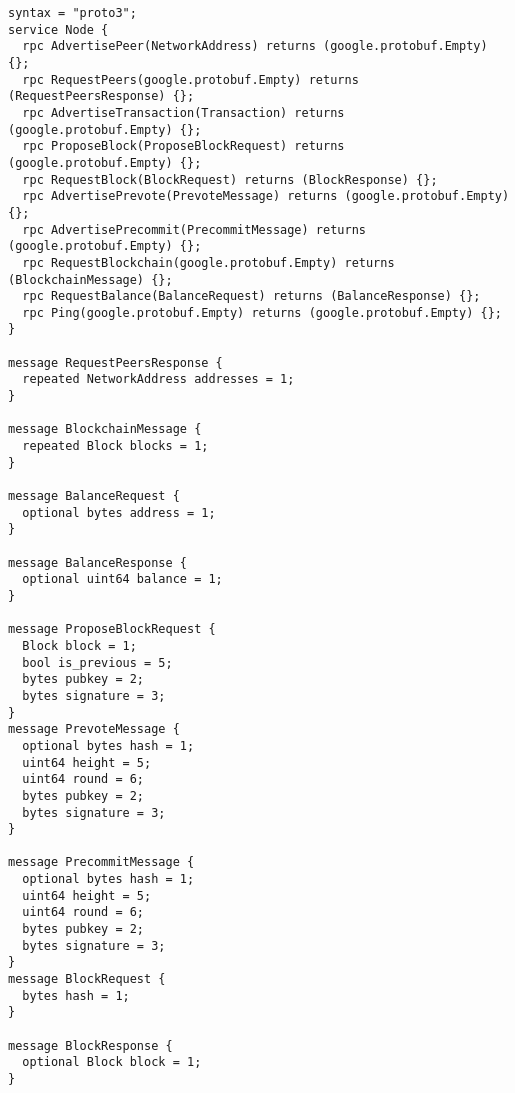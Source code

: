 \begin{verbatim}
syntax = "proto3";
service Node {
  rpc AdvertisePeer(NetworkAddress) returns (google.protobuf.Empty) {};
  rpc RequestPeers(google.protobuf.Empty) returns (RequestPeersResponse) {};
  rpc AdvertiseTransaction(Transaction) returns (google.protobuf.Empty) {};
  rpc ProposeBlock(ProposeBlockRequest) returns (google.protobuf.Empty) {};
  rpc RequestBlock(BlockRequest) returns (BlockResponse) {};
  rpc AdvertisePrevote(PrevoteMessage) returns (google.protobuf.Empty) {};
  rpc AdvertisePrecommit(PrecommitMessage) returns (google.protobuf.Empty) {};
  rpc RequestBlockchain(google.protobuf.Empty) returns (BlockchainMessage) {};
  rpc RequestBalance(BalanceRequest) returns (BalanceResponse) {};
  rpc Ping(google.protobuf.Empty) returns (google.protobuf.Empty) {};
}

message RequestPeersResponse {
  repeated NetworkAddress addresses = 1;
}

message BlockchainMessage {
  repeated Block blocks = 1;
}

message BalanceRequest {
  optional bytes address = 1;
}

message BalanceResponse {
  optional uint64 balance = 1;
}

message ProposeBlockRequest {
  Block block = 1;
  bool is_previous = 5;
  bytes pubkey = 2;
  bytes signature = 3;
}
message PrevoteMessage {
  optional bytes hash = 1;
  uint64 height = 5;
  uint64 round = 6;
  bytes pubkey = 2;
  bytes signature = 3;
}

message PrecommitMessage {
  optional bytes hash = 1;
  uint64 height = 5;
  uint64 round = 6;
  bytes pubkey = 2;
  bytes signature = 3;
}
message BlockRequest {
  bytes hash = 1;
}

message BlockResponse {
  optional Block block = 1;
}
\end{verbatim}
